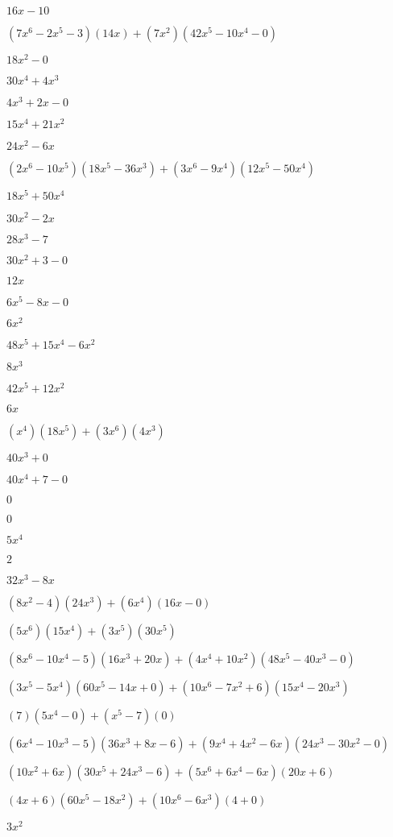\documentclass{article}
\begin{document}
\begin{multicols}{2}
$16x-10$\item $(7x^{6}-2x^{5}-3)(14x)+(7x^2)(42x^{5}-10x^{4}-0)$\item $18x^{2}-0$\item $30x^{4}+4x^{3}$\item $4x^{3}+2x-0$\item $15x^{4}+21x^{2}$\item $24x^{2}-6x$\item $(2x^{6}-10x^{5})(18x^{5}-36x^{3})+(3x^{6}-9x^{4})(12x^{5}-50x^{4})$\item $18x^{5}+50x^{4}$\item $30x^{2}-2x$\item $28x^{3}-7$\item $30x^{2}+3-0$\item $12x$\item $6x^{5}-8x-0$\item $6x^{2}$\item $48x^{5}+15x^{4}-6x^{2}$\item $8x^{3}$\item $42x^{5}+12x^{2}$\item $6x$\item $(x^{4})(18x^{5})+(3x^{6})(4x^{3})$\item $40x^{3}+0$\item $40x^{4}+7-0$\item $0$\item $0$\item $5x^{4}$\item $2$\item $32x^{3}-8x$\item $(8x^2-4)(24x^{3})+(6x^{4})(16x-0)$\item $(5x^{6})(15x^{4})+(3x^{5})(30x^{5})$\item $(8x^{6}-10x^{4}-5)(16x^{3}+20x)+(4x^{4}+10x^2)(48x^{5}-40x^{3}-0)$\item $(3x^{5}-5x^{4})(60x^{5}-14x+0)+(10x^{6}-7x^2+6)(15x^{4}-20x^{3})$\item $(7)(5x^{4}-0)+(x^{5}-7)(0)$\item $(6x^{4}-10x^{3}-5)(36x^{3}+8x-6)+(9x^{4}+4x^2-6x)(24x^{3}-30x^{2}-0)$\item $(10x^2+6x)(30x^{5}+24x^{3}-6)+(5x^{6}+6x^{4}-6x)(20x+6)$\item $(4x+6)(60x^{5}-18x^{2})+(10x^{6}-6x^{3})(4+0)$\item $3x^{2}$\item 
\end{multicols}
\end{document}
